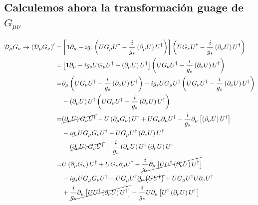 \subsection{Calculemos ahora la transformación guage de $G_{\mu\nu}$}
\begin{align}
\label{eq:tdcg}
 \mathcal{D}_{\mu} {G}_{\nu}\to   \left(   \mathcal{D}_{\mu} {G}_{\nu} \right)' =&
\left[\boldsymbol{1}\partial_{\mu}-i g_s\left({U} {G}_\mu {U}^{\dagger}-\frac{i}{g_s}\left(\partial_\mu {U}\right){U}^\dagger  \right)   \right] \left({U} {G}_\nu {U}^{\dagger}-\frac{i}{g_s}\left(\partial_\nu {U}\right){U}^\dagger  \right) \nonumber\\
=&
\left[\boldsymbol{1}\partial_{\mu}-i g_s{U} {G}_\mu {U}^{\dagger}-\left(\partial_\mu {U}\right){U}^\dagger   \right] \left({U} {G}_\nu {U}^{\dagger}-\frac{i}{g_s}\left(\partial_\nu {U}\right){U}^\dagger  \right) \nonumber\\
=&
\partial_{\mu} \left({U} {G}_\nu {U}^{\dagger}-\frac{i}{g_s}\left(\partial_\nu {U}\right){U}^\dagger  \right)
-i g_s{U} {G}_\mu {U}^{\dagger}\left({U} {G}_\nu {U}^{\dagger}-\frac{i}{g_s}\left(\partial_\nu {U}\right){U}^\dagger  \right)
\nonumber\\
&-\left(\partial_\mu {U}\right){U}^\dagger\left({U} {G}_\nu {U}^{\dagger}-\frac{i}{g_s}\left(\partial_\nu {U}\right){U}^\dagger  \right) \nonumber\\
  =& \cancel{\left(\partial_{\mu} {U} \right) {G}_\nu {U}^{\dagger}} + {U}
  \left( \partial_{\mu}{G}_\nu \right) {U}^{\dagger} + {U}
  {G}_{\nu} \partial_{\mu} {U}^{\dagger} -\frac{i}{g_s}\partial_{\mu}
  \left[ \left( \partial_{\nu}{U} \right){U}^{\dagger} \right]
  \nonumber\\
  &-i g_s {U} {G}_{\mu}{G}_{\nu}{U}^{\dagger}- {U}{G}_{\mu} {U}^{\dagger} \left( \partial_{\nu} {U}\right){U}^{\dagger} \nonumber\\
  &-\cancel{\left( \partial_{\mu}{U} \right){G}_{\nu} {U}^{\dagger}}
  +\frac{i}{g_s} \left( \partial_{\mu}{U} \right) {U}^{\dagger} \left( \partial_{\nu}{U} \right) {U}^{\dagger} \nonumber\\
  =& {U} \left( \partial_{\mu}{G}_\nu \right) {U}^{\dagger} + {U}
  {G}_{\nu} \partial_{\mu} {U}^{\dagger}
  -\cancel{\frac{i}{g_s}\partial_{\mu} \left[ {U}
      {U}^{\dagger}\left( \partial_{\nu}{U} \right){U}^{\dagger} \right]}
  \nonumber\\
  &-i g_s {U} {G}_{\mu}{G}_{\nu}{U}^{\dagger}- {U}{G}_{\mu}
  {U}^{\dagger}\cancel{ \partial_{\nu}\left( {U}{U}^{\dagger} \right)}+
  {U}{G}_{\mu} {U}^{\dagger} {U}\partial_{\nu}{U}^{\dagger}
  \nonumber\\
  &+\cancel{\frac{i}{g_s} \partial_{\mu} \left[ {U} {U}^{\dagger}
      \left( \partial_{\nu}{U} \right) {U}^{\dagger}\right]}-
  \frac{i}{g_s} {U} \partial_{\mu} \left[ {U}^{\dagger}
    \left( \partial_{\nu}{U} \right) {U}^{\dagger}\right]
\end{align}
